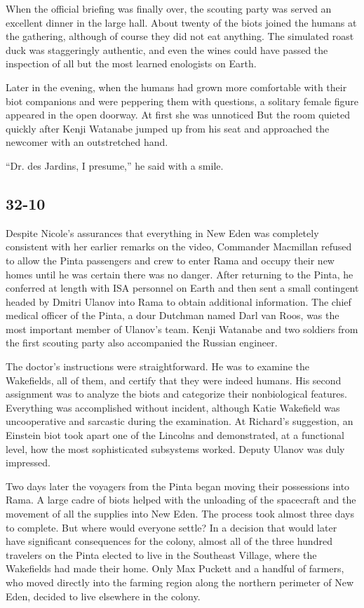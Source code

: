 \documentclass[]{article}
\begin{document}
{When the official briefing was finally over, the scouting party was served an excellent dinner in the large hall.  About twenty of the biots joined the humans at the gathering, although of course they did not eat anything.  The simulated roast duck was staggeringly authentic, and even the wines could have passed the inspection of all but the most learned enologists on Earth.

Later in the evening, when the humans had grown more comfortable with their biot companions and were peppering them with questions, a solitary female figure appeared in the open doorway.  At first she was unnoticed But the room quieted quickly after Kenji Watanabe jumped up from his seat and approached the newcomer with an outstretched hand.

“Dr.  des Jardins, I presume,” he said with a smile.


\subsection*{32-10}

Despite Nicole’s assurances that everything in New Eden was completely consistent with her earlier remarks on the video, Commander Macmillan refused to allow the Pinta passengers and crew to enter Rama and occupy their new homes until he was certain there was no danger.  After returning to the Pinta, he conferred at length with ISA personnel on Earth and then sent a small contingent headed by Dmitri Ulanov into Rama to obtain additional information.  The chief medical officer of the Pinta, a dour Dutchman named Darl van Roos, was the most important member of Ulanov’s team.  Kenji Watanabe and two soldiers from the first scouting party also accompanied the Russian engineer.

The doctor’s instructions were straightforward.  He was to examine the Wakefields, all of them, and certify that they were indeed humans.  His second assignment was to analyze the biots and categorize their nonbiological features.  Everything was accomplished without incident, although Katie Wakefield was uncooperative and sarcastic during the examination.  At Richard’s suggestion, an Einstein biot took apart one of the Lincolns and demonstrated, at a functional level, how the most sophisticated subsystems worked.  Deputy Ulanov was duly impressed.

Two days later the voyagers from the Pinta began moving their possessions into Rama.  A large cadre of biots helped with the unloading of the spacecraft and the movement of all the supplies into New Eden.  The process took almost three days to complete.  But where would everyone settle? In a decision that would later have significant consequences for the colony, almost all of the three hundred travelers on the Pinta elected to live in the Southeast Village, where the Wakefields had made their home.  Only Max Puckett and a handful of farmers, who moved directly into the farming region along the northern perimeter of New Eden, decided to live elsewhere in the colony.

}
\end{document}
